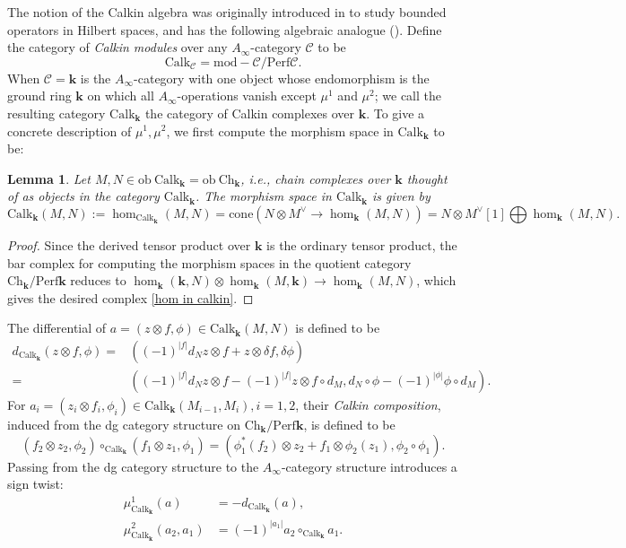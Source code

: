 \documentclass[11pt]{amsproc}
\def\K{{\mathbf{k}}}
\def\cc{\mathcal{C}}
\def\rmod{\mathrm{mod\!-\!}}
\def\d{\delta}
\def\ainf{A_\infty}
\def\ob{\mathrm{ob\ }}
\def\ch{\mathrm{Ch}}
\def\perf{\mathrm{Perf}}
\def\calk{\mathrm{Calk}}
\def\cone{\mathrm{cone}}
\newtheorem{lem}{Lemma}[section]
\theoremstyle{remark}
\numberwithin{equation}{section}
\begin{document}
The notion of the Calkin algebra was originally introduced in \cite{calkin} to study bounded operators in Hilbert spaces,
and has the following algebraic analogue (\cites{drinfeld_inf, efimov2}).
Define the category of {\it Calkin modules} over any $\ainf$-category $\cc$ to be 
\begin{equation}
\calk_{\cc} = \rmod \cc / \perf \cc.
\end{equation}
When $\cc = \K$ is the $\ainf$-category with one object whose endomorphism is the ground ring $\K$ on which all $\ainf$-operations vanish except $\mu^{1}$ and $\mu^{2}$;
we call the resulting category $\calk_{\K}$ the category of Calkin complexes over $\K$.
To give a concrete description of $\mu^{1}, \mu^{2}$, we first compute the morphism space in $\calk_{\K}$ to be:

\begin{lem}\label{lem: hom in calkin}
Let $M, N \in \ob \calk_{\K} = \ob \ch_{\K}$, i.e., chain complexes over $\K$ thought of as objects in the category $\calk_{\K}$.
The morphism space in $\calk_{\K}$ is given by
\begin{equation}\label{hom in calkin}
\calk_{\K}(M, N) := \hom_{\calk_{\K}}(M, N) = \cone(N \otimes M^{\vee} \to \hom_{\K}(M, N)) = N \otimes M^{\vee}[1] \bigoplus \hom_{\K}(M, N).
\end{equation}
\end{lem}
\begin{proof}
Since the derived tensor product over $\K$ is the ordinary tensor product, 
the bar complex for computing the morphism spaces in the quotient category $\ch_{\K}/ \perf \K$ reduces to
$\hom_{\K}(\K, N) \otimes \hom_{\K}(M, \K)  \to \hom_{\K}(M, N)$,
which gives the desired complex \eqref{hom in calkin}.
\end{proof}

The differential of $a = (z \otimes f, \phi) \in \calk_{\K}(M, N)$ is defined to be
\begin{equation}
\begin{split}
d_{\calk_{\K}}  (z \otimes f, \phi) = & ((-1)^{|f|} d_{N}z \otimes f + z \otimes \d f, \d \phi) \\
= & ((-1)^{|f|} d_{N} z \otimes f - (-1)^{|f|} z \otimes f \circ d_{M}, d_{N} \circ \phi - (-1)^{|\phi|} \phi \circ d_{M}).
\end{split}
\end{equation}
For $a_{i} = (z_{i} \otimes f_{i}, \phi_{i}) \in \calk_{\K}(M_{i-1}, M_{i}), i = 1, 2$, 
their {\it Calkin composition}, induced from the dg category structure on $\ch_{\K}/\perf \K$, is defined to be
\begin{equation}\label{calkin composition}
(f_{2} \otimes z_{2}, \phi_{2}) \circ_{\calk_{\K}} (f_{1} \otimes z_{1}, \phi_{1}) = (\phi_{1}^{*}(f_{2}) \otimes z_{2} + f_{1} \otimes \phi_{2}(z_{1}), \phi_{2} \circ \phi_{1}).
\end{equation}
Passing from the dg category structure to the $\ainf$-category structure introduces a sign twist:
\begin{align}
\mu^{1}_{\calk_{\K}}(a) & = - d_{\calk_{\K}}(a), \\
\mu^{2}_{\calk_{\K}}(a_{2}, a_{1}) & = (-1)^{|a_{1}|} a_{2} \circ_{\calk_{\K}} a_{1}. \label{mu2 calkin}
\end{align}
 
\end{document}

